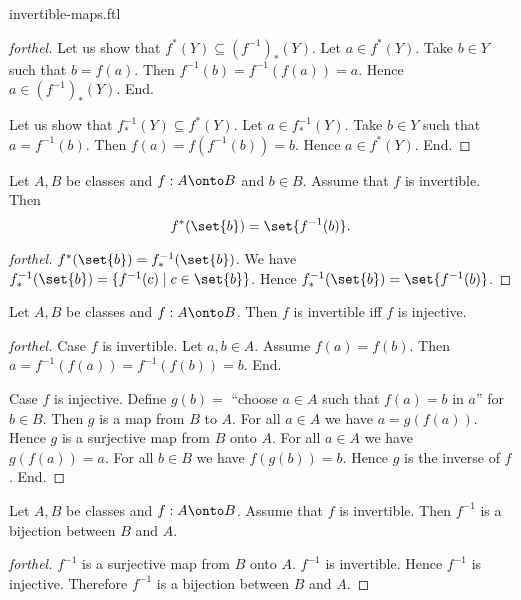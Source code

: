 \documentclass{naproche-library}
\begin{document}
\begin{smodule}{invertible-maps.ftl}
\begin{proof}[forthel]
    Let us show that $f^{*}(Y) \subseteq (f^{-1})_{*}(Y)$.
      Let $a \in f^{*}(Y)$.
      Take $b \in Y$ such that $b = f(a)$.
      Then $f^{-1}(b) = f^{-1}(f(a)) = a$.
      Hence $a \in (f^{-1})_{*}(Y)$.
    End.

    Let us show that $f^{-1}_{*}(Y) \subseteq f^{*}(Y)$.
      Let $a \in f^{-1}_{*}(Y)$.
      Take $b \in Y$ such that $a = f^{-1}(b)$.
      Then $f(a) = f(f^{-1}(b)) = b$.
      Hence $a \in f^{*}(Y)$.
    End.
  \end{proof}

  \begin{corollary}[forthel,id=FOUNDATIONS_09_8607784268464128]
    Let $A, B$ be classes and $f : A \onto B$ and $b \in B$.
    Assume that $f$ is invertible.
    Then \[ f^{*}(\set{b}) = \set{f^{-1}(b)}. \]
  \end{corollary}
  \begin{proof}[forthel]
    $f^{*}(\set{b}) = f^{-1}_{*}(\set{b})$.
    We have $f^{-1}_{*}(\set{b}) = \{ f^{-1}(c) \mid c \in \set{b} \}$.
    Hence $f^{-1}_{*}(\set{b}) = \set{f^{-1}(b)}$.
  \end{proof}

  \begin{proposition}[forthel,id=FOUNDATIONS_09_6777575974109184]
    Let $A, B$ be classes and $f : A \onto B$.
    Then $f$ is invertible iff $f$ is injective.
  \end{proposition}
  \begin{proof}[forthel]
    Case $f$ is invertible.
      Let $a, b \in A$.
      Assume $f(a) = f(b)$.
      Then $a = f^{-1}(f(a)) = f^{-1}(f(b)) = b$.
    End.

    Case $f$ is injective.
      Define $g(b) =$ ``choose $a \in A$ such that $f(a) = b$ in $a$'' for
      $b \in B$.
      Then $g$ is a map from $B$ to $A$.
      For all $a \in A$ we have $a = g(f(a))$.
      Hence $g$ is a surjective map from $B$ onto $A$.
      For all $a \in A$ we have $g(f(a)) = a$.
      For all $b \in B$ we have $f(g(b)) = b$.
      Hence $g$ is the inverse of $f$.
    End.
  \end{proof}

  \begin{corollary}[forthel,id=FOUNDATIONS_09_5708971514003456]
    Let $A, B$ be classes and $f : A \onto B$.
    Assume that $f$ is invertible.
    Then $f^{-1}$ is a bijection between $B$ and $A$.
  \end{corollary}
  \begin{proof}[forthel]
    $f^{-1}$ is a surjective map from $B$ onto $A$.
    $f^{-1}$ is invertible.
    Hence $f^{-1}$ is injective.
    Therefore $f^{-1}$ is a bijection between $B$ and $A$.
  \end{proof}



\end{smodule}
\end{document}
